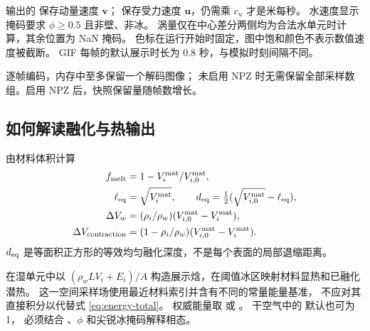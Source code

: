 输出的  保存动量速度 $\bm v$；
 保存受力速度 $\bm u$，仍需乘 $c_u$ 才是米每秒。
水速度显示掩码要求 $\phi\geq0.5$ 且非壁、非冰。
涡量仅在中心差分两侧均为合法水单元时计算，其余位置为 NaN 掩码。
色标在运行开始时固定，图中饱和颜色不表示数值速度被截断。
GIF 每帧的默认展示时长为 0.8 秒，与模拟时刻间隔不同。

 逐帧编码，内存中至多保留一个解码图像；
未启用 NPZ 时无需保留全部采样数组。启用 NPZ 后，快照保留量随帧数增长。

\subsection{如何解读融化与热输出}
由材料体积计算
\begin{align}
 f_{\rm melt}&=1-V_i^{\rm mat}/V_{i,0}^{\rm mat},\\
 \ell_{\rm eq}&=\sqrt{V_i^{\rm mat}},\qquad
 d_{\rm eq}=\tfrac12(\sqrt{V_{i,0}^{\rm mat}}-\ell_{\rm eq}),\\
 \Delta V_w&=(\rho_i/\rho_w)(V_{i,0}^{\rm mat}-V_i^{\rm mat}),\\
 \Delta V_{\rm contraction}&=(1-\rho_i/\rho_w)(V_{i,0}^{\rm mat}-V_i^{\rm mat}).
\end{align}
$d_{\rm eq}$ 是等面积正方形的等效均匀融化深度，不是每个表面的局部退缩距离。

 在湿单元中以
$(\rho_wLV_i+E_i)/A$ 构造展示焓，在阈值冰区映射材料显热和已融化潜热。
这一空间采样场使用最近材料索引并含有不同的常量能量基准，
不应对其直接积分以代替式 \eqref{eq:energy-total}。
权威能量取  或 。
干空气中的  默认也可为 1，
必须结合 、$\phi$ 和尖锐冰掩码解释相态。


